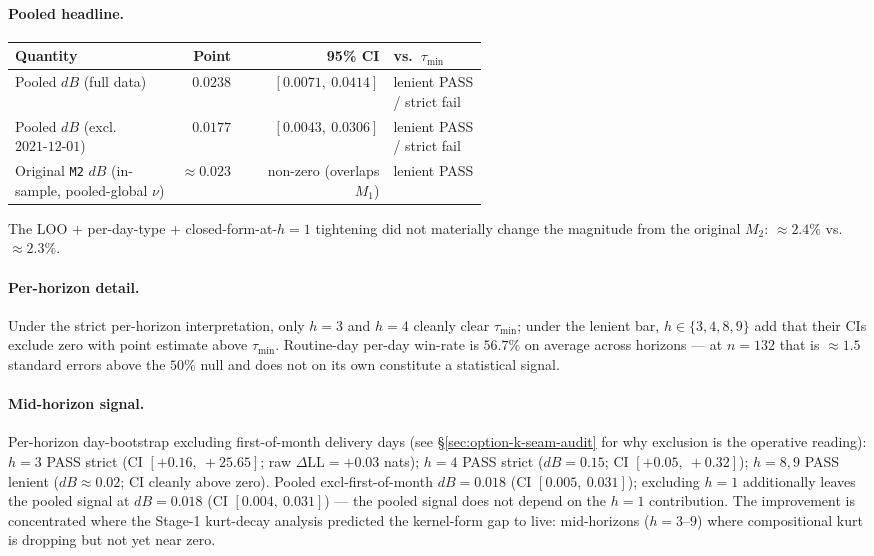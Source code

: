 \documentclass[11pt]{article}
\begin{document}
\paragraph{Pooled headline.}
\begin{center}\small
\begin{tabular}{P{0.35\linewidth} r r P{0.20\linewidth}}
\toprule
Quantity & Point & 95\% CI & vs.\ \(\tau_{\min}\) \\
\midrule
Pooled \(dB\) (full data)
  & \(0.0238\) & \([0.0071,\ 0.0414]\) & lenient PASS / strict fail \\
Pooled \(dB\) (excl.\ \(2021\text{-}12\text{-}01\))
  & \(0.0177\) & \([0.0043,\ 0.0306]\) & lenient PASS / strict fail \\
Original \texttt{M2} \(dB\) (in-sample, pooled-global \(\nu\))
  & \(\approx 0.023\) & non-zero (overlaps \(M_1\)) & lenient PASS \\
\bottomrule
\end{tabular}
\end{center}
The LOO + per-day-type + closed-form-at-\(h{=}1\) tightening did
not materially change the magnitude from the original \(M_2\):
\(\approx 2.4\%\) vs.\ \(\approx 2.3\%\).

\paragraph{Per-horizon detail.} Under the strict per-horizon
interpretation, only \(h = 3\) and \(h = 4\) cleanly clear
\(\tau_{\min}\); under the lenient bar, \(h \in \{3, 4, 8, 9\}\)
add that their CIs exclude zero with point estimate above
\(\tau_{\min}\). Routine-day per-day win-rate is \(56.7\%\) on
average across horizons --- at \(n = 132\) that is \(\approx 1.5\)
standard errors above the \(50\%\) null and does not on its own
constitute a statistical signal.

\paragraph{Mid-horizon signal.} Per-horizon day-bootstrap excluding
first-of-month delivery days (see \S\ref{sec:option-k-seam-audit}
for why exclusion is the operative reading): \(h = 3\) PASS strict
(CI \([+0.16,\ +25.65]\); raw \(\Delta\mathrm{LL} = +0.03\) nats);
\(h = 4\) PASS strict (\(dB = 0.15\); CI \([+0.05,\ +0.32]\));
\(h = 8, 9\) PASS lenient (\(dB \approx 0.02\); CI cleanly above
zero). Pooled excl-first-of-month \(dB = 0.018\) (CI
\([0.005,\ 0.031]\)); excluding \(h = 1\) additionally leaves the
pooled signal at \(dB = 0.018\) (CI \([0.004,\ 0.031]\)) --- the
pooled signal does not depend on the \(h = 1\) contribution. The
improvement is concentrated where the Stage-1 kurt-decay analysis
predicted the kernel-form gap to live: mid-horizons (\(h = 3\)--\(9\))
where compositional kurt is dropping but not yet near zero.
\end{document}
